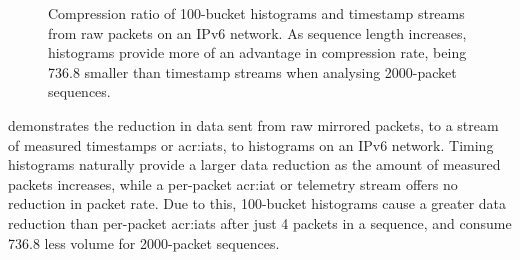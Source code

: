 \begin{figure}
    \centering
    \caption[Compression ratio of \num{100}-bucket histograms and timestamp streams from raw packets on an IPv6 network.]{Compression ratio of \num{100}-bucket histograms and timestamp streams from raw packets on an IPv6 network. As sequence length increases, histograms provide more of an advantage in compression rate, being \qty{736.8}{\times} smaller than timestamp streams when analysing \num{2000}-packet sequences.}
    \label{fig:histo-compression}
\end{figure}


 demonstrates the reduction in data sent from raw mirrored packets, to a stream of measured timestamps or \glspl{acr:iat}, to \seidr{} histograms on an IPv6 network.
Timing histograms naturally provide a larger data reduction as the amount of measured packets increases, while a per-packet \gls{acr:iat} or telemetry stream offers no reduction in packet rate.
Due to this, 100-bucket histograms cause a greater data reduction than per-packet \glspl{acr:iat} after just 4 packets in a sequence, and consume \qty{736.8}{\times} less volume for \num{2000}-packet sequences.

